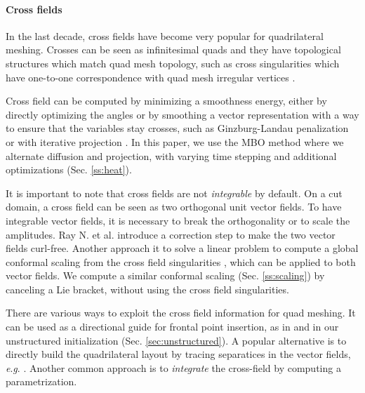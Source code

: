\documentclass[AMA,STIX1COL]{WileyNJD-v2}
\newcommand{\eg}{\textit{e}.\textit{g}. }
\newcommand\rsec[1]{Sec. \ref{#1}}
\begin{document}
{\paragraph{Cross fields}

In the last decade, cross fields \cite{hertzmann2000,Ray2006,Palacios2007} have
become very popular for quadrilateral meshing.  Crosses can be seen as
infinitesimal quads and they have topological structures which match
quad mesh topology, such as cross singularities which have one-to-one
correspondence with quad mesh irregular vertices \cite{bunin2007,Ray2008}.

Cross field can be computed by minimizing a smoothness energy, either by
directly optimizing the angles \cite{bommes2009} or by smoothing a vector
representation with a way to ensure that the variables stay crosses, such as
Ginzburg-Landau penalization \cite{beaufort2017} or with iterative projection
\cite{viertel2019}. In this paper, we use the MBO method \cite{viertel2019} where
we alternate diffusion and projection, with varying time stepping \cite{palmer2020}
and additional optimizations (\rsec{ss:heat}).

It is important to note that cross fields are not \emph{integrable} by default.
On a cut domain, a cross field can be seen as two orthogonal unit vector fields.
To have integrable vector fields, it is necessary to break
the orthogonality \cite{sageman2019} or to scale the amplitudes. 
Ray N. et al. \cite{Ray2006} introduce a correction step to make the two vector fields
curl-free. Another approach it to solve a linear problem to compute a global conformal
scaling from the cross field singularities \cite{bunin2007,ben2008}, which can be applied
to both vector fields. We compute a similar conformal scaling (\rsec{ss:scaling})
by canceling a Lie bracket, without using the cross field singularities.

There are various ways to exploit the cross field information for quad meshing.
It can be used as a directional guide for frontal point insertion, as in \cite{delquad}
and in our unstructured initialization (\rsec{sec:unstructured}). 
A popular alternative is to directly build the quadrilateral layout by
tracing separatices in the vector fields, \eg \cite{campen2012,myles2014,pietroni2016}.
Another common approach is to \emph{integrate} the cross-field by computing a parametrization.


}
\end{document}
